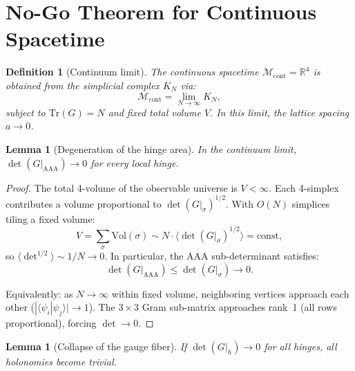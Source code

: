 \documentclass[12pt]{article}
\newtheorem{lemma}[theorem]{Lemma}
\newtheorem{definition}[theorem]{Definition}
\theoremstyle{remark}
\begin{document}
\section{No-Go Theorem for Continuous Spacetime}
\label{sec:nogo}

\begin{definition}[Continuum limit]
\label{def:continuum}
The continuous spacetime $\mathcal{M}_{\mathrm{cont}} = \mathbb{R}^4$ is
obtained from the simplicial complex $K_N$ via:
\begin{equation}
\mathcal{M}_{\mathrm{cont}} = \lim_{N \to \infty} K_N,
\end{equation}
subject to $\mathrm{Tr}(G) = N$ and fixed total volume $V$.
In this limit, the lattice spacing $a \to 0$.
\end{definition}

\begin{lemma}[Degeneration of the hinge area]
\label{lem:degen}
In the continuum limit, $\det(G|_{\mathrm{AAA}}) \to 0$ for every
local hinge.
\end{lemma}

\begin{proof}
The total 4-volume of the observable universe is $V < \infty$. Each
4-simplex contributes a volume proportional to $\det(G|_\sigma)^{1/2}$.
With $O(N)$ simplices tiling a fixed volume:
\begin{equation}
V = \sum_\sigma \mathrm{Vol}(\sigma) \sim N \cdot
\langle \det(G|_\sigma)^{1/2} \rangle = \mathrm{const},
\end{equation}
so $\langle \det^{1/2} \rangle \sim 1/N \to 0$. In particular, the
AAA sub-determinant satisfies:
\begin{equation}
\det(G|_{\mathrm{AAA}}) \leq \det(G|_\sigma) \to 0.
\end{equation}

Equivalently: as $N \to \infty$ within fixed volume, neighboring
vertices approach each other ($|\langle\psi_i|\psi_j\rangle| \to 1$).
The $3 \times 3$ Gram sub-matrix approaches rank~1 (all rows
proportional), forcing $\det \to 0$.
\end{proof}

\begin{lemma}[Collapse of the gauge fiber]
\label{lem:fiber}
If $\det(G|_h) \to 0$ for all hinges, all holonomies become trivial.
\end{lemma}
\end{document}
